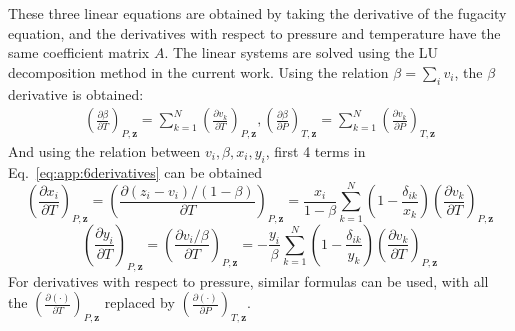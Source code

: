 These three linear equations are obtained by taking the derivative of the fugacity equation, and the derivatives with respect to pressure and temperature have the same coefficient matrix $A$. The linear systems are solved using the LU decomposition method in the current work.
Using the relation $ \beta = \sum_i v_i$, the $\beta $ derivative is obtained:
\begin{align}
\left(\frac{\partial \beta }{\partial T}\right)_{P,\mathbf{z}} = \sum_{k=1}^N \left(\frac{\partial v_k}{\partial T}\right)_{P,\mathbf{z}},\left(\frac{\partial \beta}{\partial P}\right)_{T,\mathbf{z}} = \sum_{k=1}^N \left(\frac{\partial v_k}{\partial P}\right)_{T,\mathbf{z}} \label{eq:dbetafPT}
\end{align}
And using the relation between $v_i,\beta,x_i,y_i$, first 4 terms in Eq.~\ref{eq:app:6derivatives} can be obtained 
$$\left(\frac{\partial x_i}{\partial T}\right)_{P,\mathbf{z}} = \left(\frac{\partial (z_i-v_i)/(1-\beta)}{\partial T}\right)_{P,\mathbf{z}}= \frac{x_i}{1-\beta}\sum_{k=1}^N\left(1-\frac{\delta_{ik}}{x_k}\right)\left(\frac{\partial v_k}{\partial T}\right)_{P,\mathbf{z}}$$
$$\left(\frac{\partial y_i}{\partial T}\right)_{P,\mathbf{z}} = \left(\frac{\partial v_i/\beta}{\partial T}\right)_{P,\mathbf{z}}= -\frac{y_i}{\beta}\sum_{k=1}^N\left(1-\frac{\delta_{ik}}{y_k}\right)\left(\frac{\partial v_k}{\partial T}\right)_{P,\mathbf{z}}$$
For derivatives with respect to pressure, similar formulas can be used, with all the $\left(\frac{\partial (\cdot)}{\partial T}\right)_{P,\mathbf{z}}$ replaced by $\left(\frac{\partial (\cdot)}{\partial P}\right)_{T,\mathbf{z}}$.

